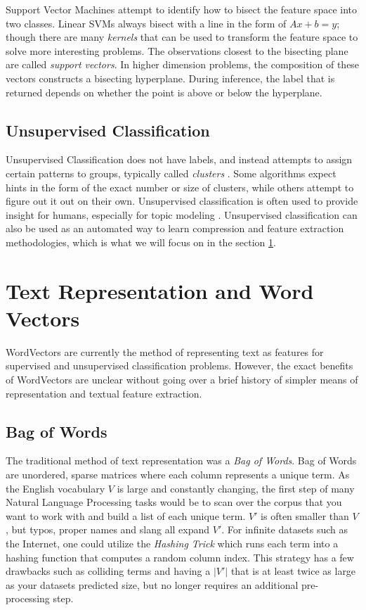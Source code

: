 Support Vector Machines attempt to identify how to bisect the feature space into two classes. Linear SVMs always bisect with a line in the form of $Ax + b = y$; though there are many \textit{kernels} that can be used to transform the feature space to solve more interesting problems. The observations closest to the bisecting plane are called \textit{support vectors}. In higher dimension problems, the composition of these vectors constructs a bisecting hyperplane. During inference, the label that is returned depends on whether the point is above or below the hyperplane.

\subsection{Unsupervised Classification}

Unsupervised Classification does not have labels, and instead attempts to assign certain patterns to groups, typically called \textit{clusters} \cite{celebi2015partitional}. Some algorithms expect hints in the form of the exact number or size of clusters, while others attempt to figure out it out on their own. Unsupervised classification is often used to provide insight for humans, especially for topic modeling \cite{celebi2015partitional}. Unsupervised classification can also be used as an automated way to learn compression and feature extraction methodologies, which is what we will focus on in the section \ref{sec:wordvectors}.  

\section{Text Representation and Word Vectors} \label{sec:wordvectors}

WordVectors \cite{word2vec} are currently the method of representing text as features for supervised and unsupervised classification problems. However, the exact benefits of WordVectors are unclear without going over a brief history of simpler means of representation and textual feature extraction.

\subsection{Bag of Words}

\par{
The traditional method of text representation was a \textit{Bag of Words}. Bag of Words are unordered, sparse matrices where each column represents a unique term. As the English vocabulary $V$ is large and constantly changing, the first step of many Natural Language Processing tasks would be to scan over the corpus that you want to work with and build a list of each unique term. $V'$ is often smaller than $V$, but typos, proper names and slang all expand $V'$. For infinite datasets such as the Internet, one could utilize the \textit{Hashing Trick} \cite{weinberger2009feature} which runs each term into a hashing function that computes a random column index. This strategy has a few drawbacks such as colliding terms and having a $|V'|$ that is at least twice as large as your datasets predicted size, but no longer requires an additional pre-processing step.
}

